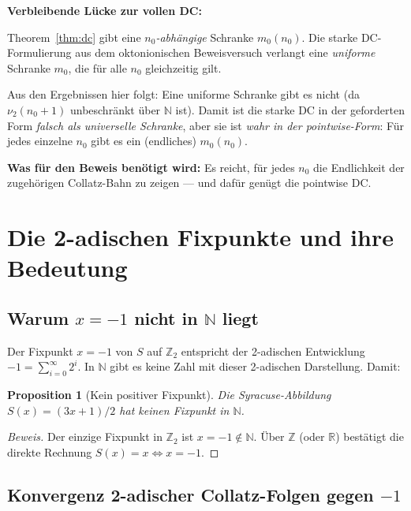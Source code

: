 \documentclass[12pt,a4paper]{article}
\newtheorem{proposition}[definition]{Proposition}
\newenvironment{beweis}{\begin{proof}[Beweis]}{\end{proof}}
\newcommand{\vii}{\nu_2}
\newcommand{\N}{\mathbb{N}}
\newcommand{\Z}{\mathbb{Z}}
\newcommand{\R}{\mathbb{R}}
\newcommand{\Ztwo}{\mathbb{Z}_2}     %
\begin{document}
\begin{tcolorbox}[lücke]
\textbf{Verbleibende Lücke zur vollen DC:}

Theorem~\ref{thm:dc} gibt eine \emph{$n_0$-abhängige} Schranke $m_0(n_0)$.
Die starke DC-Formulierung aus dem oktonionischen Beweisversuch verlangt
eine \emph{uniforme} Schranke $m_0$, die für alle $n_0$ gleichzeitig gilt.

Aus den Ergebnissen hier folgt: Eine uniforme Schranke gibt es nicht
(da $\vii(n_0+1)$ unbeschränkt über $\N$ ist). Damit ist die starke DC in
der geforderten Form \emph{falsch als universelle Schranke}, aber sie ist
\emph{wahr in der pointwise-Form}: Für jedes einzelne $n_0$ gibt es ein
(endliches) $m_0(n_0)$.

\textbf{Was für den Beweis benötigt wird:} Es reicht, für jedes $n_0$ die
Endlichkeit der zugehörigen Collatz-Bahn zu zeigen --- und dafür genügt
die pointwise DC.
\end{tcolorbox}

\section{Die 2-adischen Fixpunkte und ihre Bedeutung}

\subsection{Warum $x = -1$ nicht in $\N$ liegt}

Der Fixpunkt $x = -1$ von $S$ auf $\Ztwo$ entspricht der 2-adischen
Entwicklung $-1 = \sum_{i=0}^\infty 2^i$. In $\N$ gibt es keine Zahl
mit dieser 2-adischen Darstellung. Damit:

\begin{proposition}[Kein positiver Fixpunkt]
Die Syracuse-Abbildung $S(x) = (3x+1)/2$ hat keinen Fixpunkt in $\N$.
\end{proposition}

\begin{beweis}
Der einzige Fixpunkt in $\Ztwo$ ist $x=-1 \notin \N$.
Über $\Z$ (oder $\R$) bestätigt die direkte Rechnung $S(x)=x \Leftrightarrow x=-1$.
\end{beweis}

\subsection{Konvergenz 2-adischer Collatz-Folgen gegen $-1$}
\end{document}
